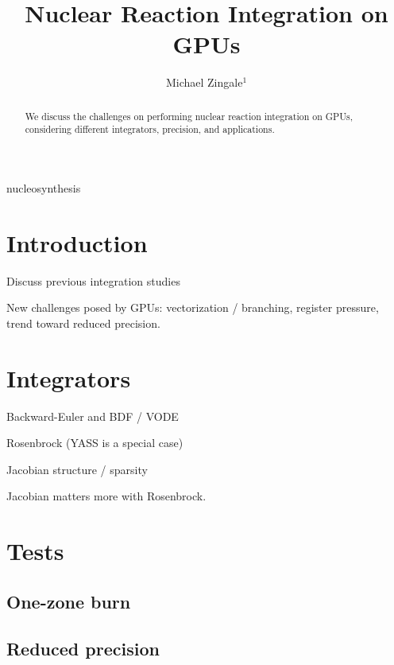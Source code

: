 \documentclass[twocolumn,apj,numberedappendix]{openjournal}
\begin{document}
\title{Nuclear Reaction Integration on GPUs}

\author{Michael Zingale$^1$}



\begin{abstract}
We discuss the challenges on performing nuclear reaction integration
on GPUs, considering different integrators, precision, and applications.
\end{abstract}

\begin{keywords}
    {nucleosynthesis}
\end{keywords}

\maketitle


\section{Introduction}


Discuss previous integration studies

New challenges posed by GPUs: vectorization / branching, register
pressure, trend toward reduced precision.

\section{Integrators}


Backward-Euler and BDF / VODE

Rosenbrock (YASS is a special case)

Jacobian structure / sparsity

Jacobian matters more with Rosenbrock.


\section{Tests}

\subsection{One-zone burn}

\subsection{Reduced precision}
\end{document}
